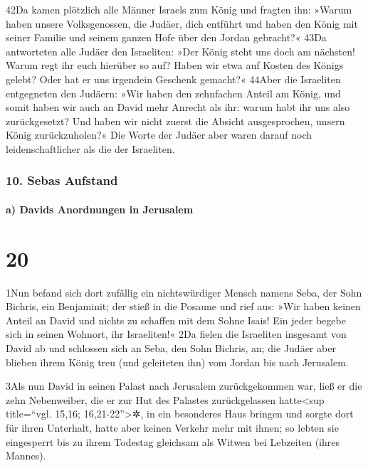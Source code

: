42Da kamen plötzlich alle Männer Israels zum König und fragten ihn:
»Warum haben unsere Volksgenossen, die Judäer, dich entführt und haben
den König mit seiner Familie und seinem ganzen Hofe über den Jordan
gebracht?« 43Da antworteten alle Judäer den Israeliten: »Der König steht
uns doch am nächsten! Warum regt ihr euch hierüber so auf? Haben wir
etwa auf Kosten des Königs gelebt? Oder hat er uns irgendein Geschenk
gemacht?« 44Aber die Israeliten entgegneten den Judäern: »Wir haben den
zehnfachen Anteil am König, und somit haben wir auch an David mehr
Anrecht als ihr: warum habt ihr uns also zurückgesetzt? Und haben wir
nicht zuerst die Absicht ausgesprochen, unsern König zurückzuholen?« Die
Worte der Judäer aber waren darauf noch leidenschaftlicher als die der
Israeliten.

\hypertarget{sebas-aufstand}{%
\subsubsection{10. Sebas Aufstand}\label{sebas-aufstand}}

\hypertarget{a-davids-anordnungen-in-jerusalem}{%
\paragraph{a) Davids Anordnungen in
Jerusalem}\label{a-davids-anordnungen-in-jerusalem}}

\hypertarget{section-19}{%
\section{20}\label{section-19}}

1Nun befand sich dort zufällig ein nichtswürdiger Mensch namens Seba,
der Sohn Bichris, ein Benjaminit; der stieß in die Posaune und rief aus:
»Wir haben keinen Anteil an David und nichts zu schaffen mit dem Sohne
Isais! Ein jeder begebe sich in seinen Wohnort, ihr Israeliten!« 2Da
fielen die Israeliten insgesamt von David ab und schlossen sich an Seba,
den Sohn Bichris, an; die Judäer aber blieben ihrem König treu (und
geleiteten ihn) vom Jordan bis nach Jerusalem.

3Als nun David in seinen Palast nach Jerusalem zurückgekommen war, ließ
er die zehn Nebenweiber, die er zur Hut des Palastes zurückgelassen
hatte\textless sup title=``vgl. 15,16; 16,21-22''\textgreater✲, in ein
besonderes Haus bringen und sorgte dort für ihren Unterhalt, hatte aber
keinen Verkehr mehr mit ihnen; so lebten sie eingesperrt bis zu ihrem
Todestag gleichsam als Witwen bei Lebzeiten (ihres Mannes).

